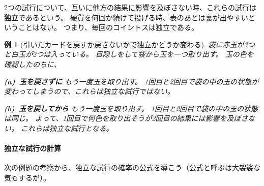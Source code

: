 \documentclass[12pt]{ltjsarticle}\usepackage{ifthen}\newcounter{enlarge}\setcounter{enlarge}{1}
\newtheorem{eg}{例}
\begin{document}
2つの試行について、互いに他方の結果に影響を及ぼさない時、これらの試行は\textbf{独立}であるという。
硬貨を何回か続けて投げる時、表のあとは裏が出やすいということはない。
つまり、毎回のコイントスは独立である。

\begin{eg}[引いたカードを戻すか戻さないかで独立かどうか変わる]
  袋に赤玉が3つと白玉が2つは入っている。
  目隠しをして袋から玉を一つ取り出す。
  玉の色を確認したのちに、

  \textbf{(a)~玉を戻さずに}
  もう一度玉を取り出す。
  1回目と2回目で袋の中の玉の状態が変わってしまうので、これらは独立な試行ではない。

  \textbf{(b)~玉を戻してから}
  もう一度玉を取り出す。
  1回目と2回目で袋の中の玉の状態は同じ。
  よって、1回目で何色を取り出そうが2回目の結果には影響を及ぼさない。
  これらは独立な試行となる。
\end{eg}

\paragraph{独立な試行の計算}

次の例題の考察から、独立な試行の確率の公式を導こう（公式と呼ぶは大袈裟な気もするが）。
\end{document}

